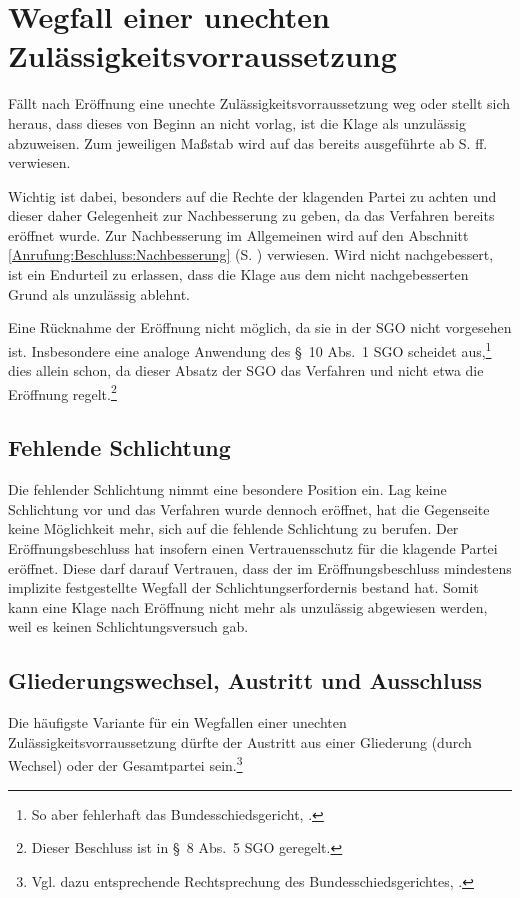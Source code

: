 \section{Wegfall einer unechten Zulässigkeitsvorraussetzung}
\label{Zulaessigkeit:Wegfall}
Fällt nach Eröffnung eine unechte Zulässigkeitsvorraussetzung weg oder stellt sich heraus, dass dieses von Beginn an nicht vorlag, ist die Klage als unzulässig abzuweisen.
Zum jeweiligen Maßstab wird auf das bereits ausgeführte ab S. \pageref{Anrufung:Statthaftigkeit} ff. verwiesen.

Wichtig ist dabei, besonders auf die Rechte der klagenden Partei zu achten und dieser daher Gelegenheit zur Nachbesserung zu geben, da das Verfahren bereits eröffnet wurde.
Zur Nachbesserung im Allgemeinen wird auf den Abschnitt \ref{Anrufung:Beschluss:Nachbesserung} (S. \pageref{Anrufung:Beschluss:Nachbesserung}) verwiesen.
Wird nicht nachgebessert, ist ein Endurteil zu erlassen, dass die Klage aus dem nicht nachgebesserten Grund als unzulässig ablehnt.

Eine Rücknahme der Eröffnung nicht möglich, da sie in der SGO nicht vorgesehen ist.
Insbesondere eine analoge Anwendung des \S~10 Abs.~1 SGO scheidet aus,\footnote{So aber fehlerhaft das Bundesschiedsgericht, \cite{BSGPP100127862}.} dies allein schon, da dieser Absatz der SGO das Verfahren und nicht etwa die Eröffnung regelt.\footnote{Dieser Beschluss ist in \S~8 Abs.~5 SGO geregelt.}

\subsection{Fehlende Schlichtung}
\label{Zulaessigkeit:Wegfall:Schlichtung}
Die fehlender Schlichtung nimmt eine besondere Position ein.
Lag keine Schlichtung vor und das Verfahren wurde dennoch eröffnet, hat die Gegenseite keine Möglichkeit mehr, sich auf die fehlende Schlichtung zu berufen.
Der Eröffnungsbeschluss hat insofern einen Vertrauensschutz für die klagende Partei eröffnet.
Diese darf darauf Vertrauen, dass der im Eröffnungsbeschluss mindestens implizite festgestellte Wegfall der Schlichtungserfordernis bestand hat.
Somit kann eine Klage nach Eröffnung nicht mehr als unzulässig abgewiesen werden, weil es keinen Schlichtungsversuch gab.

\subsection{Gliederungswechsel, Austritt und Ausschluss}
\label{Zulaessigkeit:Wegfall:Austritt}
Die häufigste Variante für ein Wegfallen einer unechten Zulässigkeitsvorraussetzung dürfte der Austritt aus einer Gliederung (durch Wechsel) oder der Gesamtpartei sein.\footnote{Vgl. dazu entsprechende Rechtsprechung des Bundesschiedsgerichtes, \cites{BSG20121128}{BSG20130116}.}

